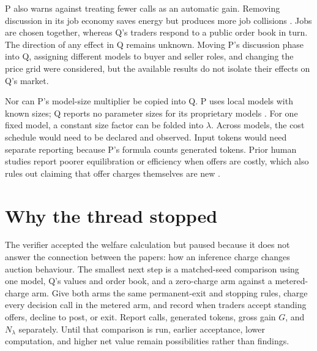 \documentclass{article}
\begin{document}
P also warns against treating fewer calls as an automatic gain. Removing discussion in its job economy
saves energy but produces more job collisions \cite{p}. Jobs are chosen together, whereas Q's traders
respond to a public order book in turn. The direction of any effect in Q remains unknown. Moving P's
discussion phase into Q, assigning different models to buyer and seller roles, and changing the price
grid were considered, but the available results do not isolate their effects on Q's market.

Nor can P's model-size multiplier be copied into Q. P uses local models with known sizes; Q reports no
parameter sizes for its proprietary models \cite{p,q}. For one fixed model, a constant size factor can be
folded into \(\lambda\). Across models, the cost schedule would need to be declared and observed. Input
tokens would need separate reporting because P's formula counts generated tokens. Prior human studies
report poorer equilibration or efficiency when offers are costly, which also rules out claiming that
offer charges themselves are new \cite{jamison,noussair}.

\section{Why the thread stopped}

The verifier accepted the welfare calculation but paused because it does not answer the connection
between the papers: how an inference charge changes auction behaviour. The smallest next step is a
matched-seed comparison using one model, Q's values and order book, and a zero-charge arm against a
metered-charge arm. Give both arms the same permanent-exit and stopping rules, charge every decision call
in the metered arm, and record when traders accept standing offers, decline to post, or exit. Report
calls, generated tokens, gross gain \(G\), and \(N_{\lambda}\) separately. Until that comparison is run,
earlier acceptance, lower computation, and higher net value remain possibilities rather than findings.



\end{document}
